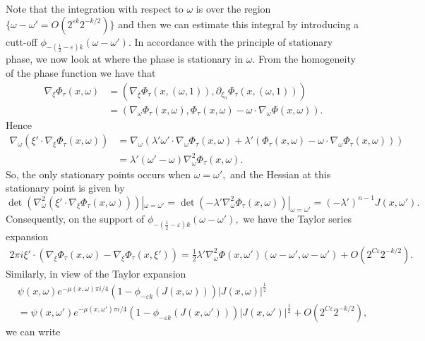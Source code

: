 \documentclass[12pt, reqno]{amsart}
\theoremstyle{definition}
\theoremstyle{remark}
\numberwithin{equation}{section}
\begin{document}
Note that the integration with respect to $\omega$ is over the region $\{\omega-\omega'=O(2^{\varepsilon k}2^{-k/2})\}$ and then we can estimate this integral by introducing a cutt-off $\phi_{-(\frac{1}{2}-\varepsilon)k}(\omega-\omega').$
In accordance with the principle of stationary phase, we now look at where the phase is stationary in $\omega.$ From the homogeneity of the phase function we have that
\begin{align*}
    \nabla_\xi \Phi_\tau(x,\omega) &=(\nabla_{\overline{\xi}}\Phi_\tau(x, (\omega,1)), \partial_{\xi_n}\Phi_\tau(x,(\omega,1))   )\\
    &=(\nabla_\omega\Phi_\tau(x,\omega), \Phi_\tau(x,\omega)-\omega\cdot \nabla_\omega\Phi(x,\omega)  ).
\end{align*} Hence
\begin{align*}
\nabla_\omega(\xi'\cdot \nabla_\xi \Phi_\tau(x,\omega)  )&=\nabla_\omega(\lambda'\omega'\cdot \nabla_\omega \Phi_\tau(x,\omega)+\lambda'(\Phi_\tau(x,\omega)-\omega\cdot \nabla_\omega\Phi_\tau(x,\omega)  ) )\\
    &=\lambda'(\omega'-\omega)\nabla_\omega^2\Phi_\tau(x,\omega).
\end{align*}So, the only stationary points occurs when $\omega=\omega',$ and the Hessian at this stationary point is given by
\begin{equation}
    \det( \nabla_\omega^2(\xi'\cdot \nabla_\xi \Phi_\tau(x,\omega)  ) )|_{\omega=\omega'}=\det(-\lambda' \nabla_\omega^2\Phi_\tau(x,\omega) )|_{\omega=\omega'}=(-\lambda')^{n-1}J(x,\omega').
\end{equation}Consequently, on the support of  $\phi_{-(\frac{1}{2}-\varepsilon)k}(\omega-\omega'),$ we have the Taylor series expansion
\begin{align*}
    2\pi i \xi'\cdot( \nabla_\xi\Phi_\tau(x,\omega)- \nabla_\xi\Phi_\tau(x,\xi')) =\frac{1}{2}\lambda'\nabla_\omega^2\Phi(x,\omega')(\omega-\omega',\omega-\omega')+O(2^{C\varepsilon}2^{-k/2}).
\end{align*}
Similarly, in view of the Taylor expansion
\begin{align*}
     &\psi(x,\omega)e^{-\mu(x,\omega)\pi i/4}(1-\phi_{-\varepsilon k}(J(x,\omega))) |J(x,\omega)|^{\frac{1}{2}}\\
    &=\psi(x,\omega')e^{-\mu(x,\omega')\pi i/4}(1-\phi_{-\varepsilon k}(J(x,\omega'))) |J(x,\omega')|^{\frac{1}{2}}+O(2^{C\varepsilon}2^{-k/2}),
\end{align*} we can write
\end{document}

